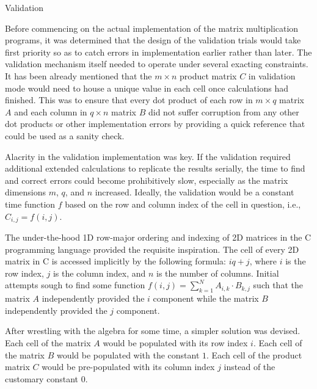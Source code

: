 \documentclass{article}
\begin{document}
\begin{section}{Validation}
  \begin{paragraph}{}
    Before commencing on the actual implementation of the matrix multiplication programs, it was determined that the design of
    the validation trials would take first priority so as to catch errors in implementation earlier rather than later.
    The validation mechanism itself needed to operate under several exacting constraints. It has been already mentioned
    that the $m \times n$ product matrix $C$ in validation mode would need to house a unique value in each cell once calculations had finished.
    This was to ensure that every dot product of each row in $m \times q$ matrix $A$ and each column in $q \times n$ matrix $B$ did not suffer corruption
    from any other dot products or other implementation errors by providing a quick reference that could be used as a sanity check.
  \end{paragraph}
  \begin{paragraph}{}
    Alacrity in the validation implementation was key. If the validation required additional extended calculations to replicate the results serially,
    the time to find and correct errors could become prohibitively slow, especially as the matrix dimensions $m$, $q$, and $n$ increased.
    Ideally, the validation would be a constant time function $f$ based on the row and column index of the cell in question, i.e.,
    $C_{i,j} = f(i,j)$.
  \end{paragraph}
  \begin{paragraph}{}
    The under-the-hood 1D row-major ordering and indexing of 2D matrices in the C programming language provided the requisite inspiration.
    The cell of every 2D matrix in C is accessed implicitly by the following formula: $iq +j$, where $i$ is the row index,
    $j$ is the column index, and $n$ is the number of columns\autocite[][113]{KnR}. Initial attempts sough to find some function $f(i,j) = \displaystyle\sum_{k=1}^{N} A_{i,k} \cdot B_{k,j}$
    such that the matrix $A$ independently provided the $i$ component while the matrix $B$ independently provided the $j$ component.
  \end{paragraph}
  \begin{paragraph}{}
    After wrestling with the algebra for some time, a simpler solution was devised. Each cell of the matrix $A$
    would be populated with its row index $i$. Each cell of the matrix $B$ would be populated with the constant $1$.
    Each cell of the product matrix $C$ would be pre-populated with its column index $j$ instead of the customary constant $0$.

\end{paragraph}
\end{section}
\end{document}

